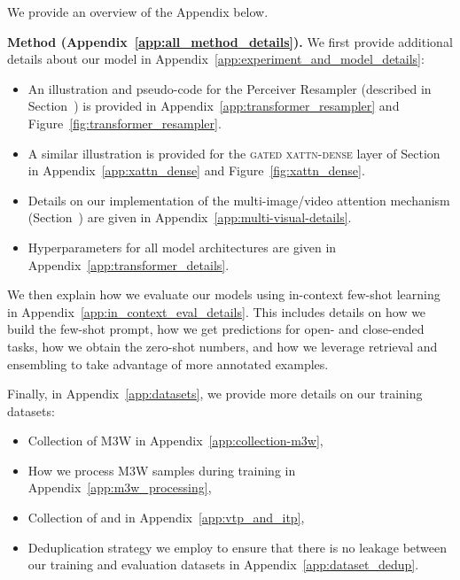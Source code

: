 

We provide an overview of the Appendix below.

\noindent
\textbf{Method (Appendix~\ref{app:all_method_details}).}
We first provide additional details about our model in Appendix~\ref{app:experiment_and_model_details}:
\begin{itemize}
    \item An illustration and pseudo-code for the Perceiver Resampler (described in Section~) is provided in Appendix~\ref{app:transformer_resampler} and Figure~\ref{fig:transformer_resampler}.
    \item A similar illustration is provided for the \textsc{gated xattn-dense} layer of Section~ in Appendix~\ref{app:xattn_dense} and Figure~\ref{fig:xattn_dense}.
    \item Details on our implementation of the multi-image/video attention mechanism (Section~) are given in Appendix~\ref{app:multi-visual-details}.
    \item Hyperparameters for all model architectures are given in Appendix~\ref{app:transformer_details}.
\end{itemize}

We then explain how we evaluate our models using in-context few-shot learning in Appendix~\ref{app:in_context_eval_details}. This includes details on how we build the few-shot prompt, how we get predictions for open- and close-ended tasks, how we obtain the zero-shot numbers, and how we leverage retrieval and ensembling to take advantage of more annotated examples.

Finally, in Appendix~\ref{app:datasets}, we provide more details on our training datasets:
\begin{itemize}
    \item Collection of M3W in Appendix~\ref{app:collection-m3w},
    \item How we process M3W samples during training in Appendix~\ref{app:m3w_processing},
    \item Collection of \shortimagetextpairs{} and \shortvideotextpairs{} in Appendix~\ref{app:vtp_and_itp},
    \item Deduplication strategy we employ to ensure that there is no leakage between our training and evaluation datasets in Appendix~\ref{app:dataset_dedup}.
\end{itemize}

